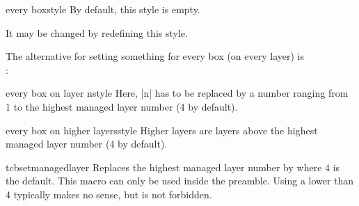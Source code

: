 \begin{docTcbKey}{every box}{}{style}
By default, this style is empty.
\begin{dispListing}
\end{dispListing}
It may be changed by redefining this style.
\begin{dispListing}
\end{dispListing}

\medskip
\begin{marker}
The alternative for setting something for every box (on every layer) is\\
:
\begin{dispListing}
\end{dispListing}
\end{marker}
\end{docTcbKey}

\clearpage
\begin{docTcbKey}{every box on layer n}{}{style}
Here, |n| has to be replaced by a number ranging from 1 to the highest
managed layer number (4 by default).
\begin{dispListing}
\end{dispListing}
\end{docTcbKey}


\begin{docTcbKey}{every box on higher layers}{}{style}
Higher layers are layers above the highest
managed layer number (4 by default).
\begin{dispListing}
\end{dispListing}
\end{docTcbKey}


\begin{docCommand}{tcbsetmanagedlayer}{}
Replaces the highest managed layer number by  where 4 is
the default. This macro can only be used inside the preamble.
Using a  lower than 4 typically makes no sense, but is
not forbidden.
\end{docCommand}

